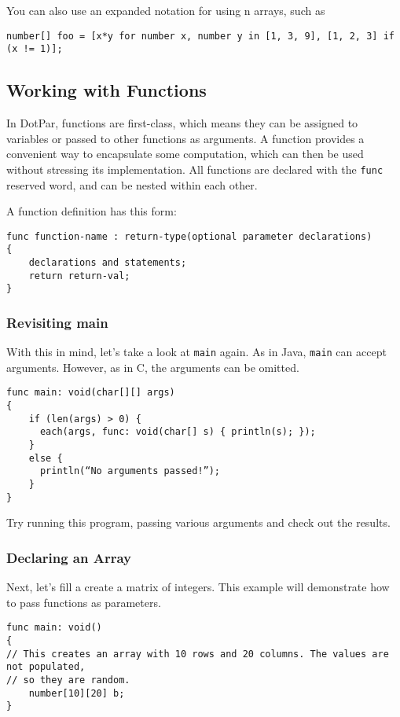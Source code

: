 You can also use an expanded notation for using n arrays, such as

\begin{verbatim}
number[] foo = [x*y for number x, number y in [1, 3, 9], [1, 2, 3] if (x != 1)];
\end{verbatim}

\subsection{Working with Functions}
In DotPar, functions are first-class, which means they can be assigned to variables or passed to other functions as arguments. A function provides a convenient way to encapsulate some computation, which can then be used without stressing its implementation. All functions are declared with the \verb=func= reserved word, and can be nested within each other.

A function definition has this form:

\begin{verbatim}
func function-name : return-type(optional parameter declarations)
{
    declarations and statements;
    return return-val;
}
\end{verbatim}

\subsubsection{Revisiting main}
With this in mind, let's take a look at \verb=main= again. As in Java, \verb=main= can accept arguments. However, as in C, the arguments can be omitted.

\begin{verbatim}
func main: void(char[][] args)
{
    if (len(args) > 0) {
      each(args, func: void(char[] s) { println(s); });
    }   
    else {
      println(“No arguments passed!”);
    }
}
\end{verbatim}

Try running this program, passing various arguments and check out the results.

\subsubsection{Declaring an Array}
Next, let's fill a create a matrix of integers. This example will demonstrate how to pass functions as parameters.

\begin{verbatim}
func main: void()
{
// This creates an array with 10 rows and 20 columns. The values are not populated,
// so they are random.
    number[10][20] b;
}
\end{verbatim}

